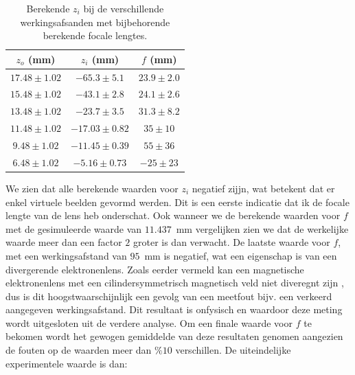 \documentclass[we,twoside,openright,a4paper,11pt]{uantwerpenbamathesis}
\begin{document}
\begin{table}[H]
    \centering
    \begin{tabular}{@{}ccc@{}}
    \toprule
    $z_o$ (mm) & $z_i$ (mm) & $f$ (mm) \\ \midrule
    \multicolumn{1}{|c|}{$17.48 \pm 1.02$} & \multicolumn{1}{c|}{$-65.3 \pm 5.1$}  & \multicolumn{1}{c|}{$23.9 \pm 2.0$}  \\ \midrule
    \multicolumn{1}{|c|}{$15.48 \pm 1.02$} & \multicolumn{1}{c|}{$-43.1 \pm 2.8$}  & \multicolumn{1}{c|}{$24.1 \pm 2.6$}  \\ \midrule
    \multicolumn{1}{|c|}{$13.48 \pm 1.02$} & \multicolumn{1}{c|}{$-23.7 \pm 3.5$}  & \multicolumn{1}{c|}{$31.3 \pm 8.2$}  \\ \midrule
    \multicolumn{1}{|c|}{$11.48 \pm 1.02$} & \multicolumn{1}{c|}{$-17.03 \pm 0.82$} & \multicolumn{1}{c|}{$35 \pm 10$}     \\ \midrule
    \multicolumn{1}{|c|}{$9.48 \pm 1.02$}  & \multicolumn{1}{c|}{$-11.45 \pm 0.39$} & \multicolumn{1}{c|}{$55 \pm 36$}     \\ \midrule
    \multicolumn{1}{|c|}{$6.48 \pm 1.02$}  & \multicolumn{1}{c|}{$-5.16 \pm 0.73$}  & \multicolumn{1}{c|}{$-25 \pm 23$}   \\ \bottomrule
    \end{tabular}
    \caption{Berekende $z_i$ bij de verschillende werkingsafsanden met bijbehorende berekende focale lengtes.}
    \label{tb:brandpuntsafstand}
\end{table}

We zien dat alle berekende waarden voor $z_i$ negatief zijjn, wat betekent dat er enkel virtuele beelden gevormd werden. Dit is een eerste indicatie dat ik de focale lengte van de lens heb onderschat. Ook wanneer we de berekende waarden voor $f$ met de gesimuleerde waarde van $11.437$~mm vergelijken zien we dat de werkelijke waarde meer dan een factor $2$ groter is dan verwacht. De laatste waarde voor $f$, met een werkingsafstand van $95$~mm is negatief, wat een eigenschap is van een divergerende elektronenlens. Zoals eerder vermeld kan een magnetische elektronenlens met een cilindersymmetrisch magnetisch veld niet diveregnt zijn \cite{scherzer1936}, dus is dit hoogstwaarschijnlijk een gevolg van een meetfout bijv. een verkeerd aangegeven werkingsafstand.  Dit resultaat is onfysisch en waardoor deze meting wordt uitgesloten uit de verdere analyse. Om een finale waarde voor $f$ te bekomen wordt het gewogen gemiddelde van deze resultaten genomen aangezien de fouten op de waarden meer dan $\%10$ verschillen. De uiteindelijke experimentele waarde is dan:
\end{document}
